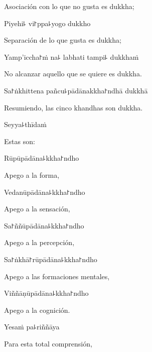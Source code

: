 \begin{english}
  Asociación con lo que no gusta es dukkha;
\end{english}

Piyehi꜕ vi꜓ppa꜕yogo dukkho

\begin{english}
  Separación de lo que gusta es dukkha;
\end{english}

Yamp'iccha꜓ṁ na꜕ labhati tampi꜕ dukkhaṁ

\begin{english}
  No alcanzar aquello que se quiere es dukkha.
\end{english}

Sa꜓ṅkhittena pañcu꜕pādānakkha꜓ndhā dukkhā

\begin{english}
  Resumiendo, las cinco khandhas son dukkha.
\end{english}

Seyya꜕thīdaṁ

\begin{english}
  Estas son:
\end{english}

\clearpage

Rūpūpādāna꜕kkha꜓ndho

\begin{english}
  Apego a la forma,
\end{english}

Vedanūpādāna꜕kkha꜓ndho

\begin{english}
  Apego a la sensación,
\end{english}

Sa꜓ññūpādāna꜕kkha꜓ndho

\begin{english}
  Apego a la percepción,
\end{english}

Sa꜓ṅkhā꜓rūpādāna꜕kkha꜓ndho

\begin{english}
  Apego a las formaciones mentales,
\end{english}

Viññāṇūpādāna꜕kkha꜓ndho

\begin{english}
  Apego a la cognición.
\end{english}

Yesaṁ pa꜕riññāya

\begin{english}
  Para esta total comprensión,
\end{english}

